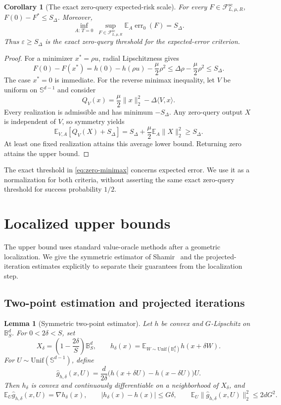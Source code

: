 \documentclass[11pt]{article}
\newcommand{\E}{\mathbb{E}}
\newcommand{\B}{\mathbb{B}}
\newcommand{\Sph}{\mathbb{S}}
\newcommand{\cF}{\mathcal{F}}
\newcommand{\eps}{\varepsilon}
\newcommand{\inner}[2]{\langle #1,#2\rangle}
\newcommand{\norm}[1]{\lVert #1\rVert_2}
\newcommand{\err}{\operatorname{err}}
\theoremstyle{plain}
\newtheorem{lemma}[lemma]{Lemma}
\newtheorem{corollary}[corollary]{Corollary}
\theoremstyle{definition}
\begin{document}
\begin{corollary}[The exact zero-query expected-risk scale]\label{cor:zero-query}
For every $F\in\cF^{\mathrm{sc}}_{L,\mu,R}$,
$F(0)-F^*\le S_\Delta$. Moreover,
\begin{equation}\label{eq:zero-minimax}
 \inf_{A:\,T=0}\ \sup_{F\in\cF^{\mathrm{sc}}_{L,\mu,R}}
     \E_A\err_0(F)=S_\Delta.
\end{equation}
Thus $\eps\ge S_\Delta$ is the exact zero-query threshold for
the expected-error criterion.
\end{corollary}

\begin{proof}
For a minimizer $x^*=\rho u$, radial Lipschitzness gives
\[
 F(0)-F(x^*)=h(0)-h(\rho u)-\frac{\mu}{2}\rho^2
 \le\Delta\rho-\frac{\mu}{2}\rho^2\le S_\Delta.
\]
The case $x^*=0$ is immediate. For the reverse minimax inequality,
let $V$ be uniform on $\Sph^{d-1}$ and consider
\[
 Q_V(x)=\frac{\mu}{2}\norm{x}^2-\Delta\inner{V}{x}.
\]
Every realization is admissible and has minimum $-S_\Delta$.
Any zero-query output $X$ is independent of $V$, so symmetry yields
\[
 \E_{V,A}[Q_V(X)+S_\Delta]
 =S_\Delta+\frac{\mu}{2}\E_A\norm{X}^2\ge S_\Delta.
\]
At least one fixed realization attains this average lower bound.
Returning zero attains the upper bound.
\end{proof}

The exact threshold in \eqref{eq:zero-minimax} concerns expected
error. We use it as a normalization for both criteria, without
asserting the same exact zero-query threshold for success probability
$1/2$.

\section{Localized upper bounds}\label{sec:upper}

The upper bound uses standard value-oracle methods after a geometric
localization. We give the symmetric estimator of Shamir~\cite{Shamir2017}
and the projected-iteration estimates
explicitly to separate their guarantees from the localization step.

\subsection{Two-point estimation and projected iterations}

\begin{lemma}[Symmetric two-point estimator]\label{lem:two-point}
Let $h$ be convex and $G$-Lipschitz on $\B_S^d$. For
$0<2\delta<S$, set
\[
 X_\delta=\left(1-\frac{2\delta}{S}\right)\B_S^d,
 \qquad
 h_\delta(x)=\E_{W\sim\mathrm{Unif}(\B_1^d)}h(x+\delta W).
\]
For $U\sim\mathrm{Unif}(\Sph^{d-1})$, define
\[
 \widehat g_{h,\delta}(x,U)=
 \frac{d}{2\delta}\bigl(h(x+\delta U)-h(x-\delta U)\bigr)U.
\]
Then $h_\delta$ is convex and continuously differentiable on a
neighborhood of $X_\delta$, and
\begin{equation}\label{eq:two-point-properties}
 \E_U\widehat g_{h,\delta}(x,U)=\nabla h_\delta(x),\qquad
 |h_\delta(x)-h(x)|\le G\delta,\qquad
 \E_U\norm{\widehat g_{h,\delta}(x,U)}^2\le2dG^2.
\end{equation}
\end{lemma}
\end{document}
